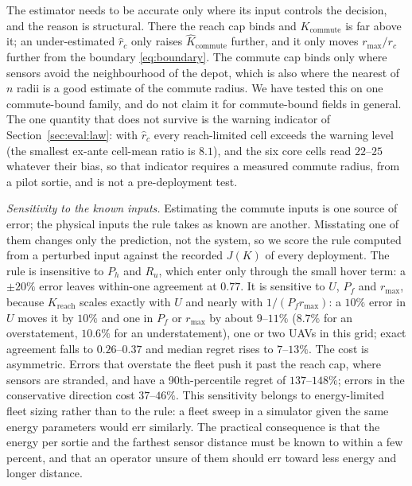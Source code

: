 \documentclass[journal,outdir=./]{IEEEtran}
\newcommand{\Kr}{K_{\mathrm{reach}}}
\newcommand{\Kc}{K_{\mathrm{commute}}}
\newcommand{\rmax}{r_{\max}}
\newcommand{\rc}{r_{c}}
\newcommand{\Pf}{P_{f}}
\newcommand{\Ph}{P_{h}}
\newcommand{\Ru}{R_u}
\begin{document}
The estimator needs to be accurate only where its input controls the decision, and the reason is structural. There the reach cap binds and $\Kc$ is far above it; an under-estimated $\hat\rc$ only raises $\hat\Kc$ further, and it only moves $\rmax/\rc$ further from the boundary \eqref{eq:boundary}. The commute cap binds only where sensors avoid the neighbourhood of the depot, which is also where the nearest of $n$ radii is a good estimate of the commute radius. We have tested this on one commute-bound family, and do not claim it for commute-bound fields in general. The one quantity that does not survive is the warning indicator of Section~\ref{sec:eval:law}: with $\hat\rc$ every reach-limited cell exceeds the warning level (the smallest ex-ante cell-mean ratio is $8.1$), and the six core cells read $22$--$25$ whatever their bias, so that indicator requires a measured commute radius, from a pilot sortie, and is not a pre-deployment test.

\textit{Sensitivity to the known inputs.} Estimating the commute inputs is one source of error; the physical inputs the rule takes as known are another. Misstating one of them changes only the prediction, not the system, so we score the rule computed from a perturbed input against the recorded $J(K)$ of every deployment. The rule is insensitive to $\Ph$ and $\Ru$, which enter only through the small hover term: a $\pm20\%$ error leaves within-one agreement at $0.77$. It is sensitive to $U$, $\Pf$ and $\rmax$, because $\Kr$ scales exactly with $U$ and nearly with $1/(\Pf\rmax)$: a $10\%$ error in $U$ moves it by $10\%$ and one in $\Pf$ or $\rmax$ by about $9$--$11\%$ ($8.7\%$ for an overstatement, $10.6\%$ for an understatement), one or two UAVs in this grid; exact agreement falls to $0.26$--$0.37$ and median regret rises to $7$--$13\%$. The cost is asymmetric. Errors that overstate the fleet push it past the reach cap, where sensors are stranded, and have a 90th-percentile regret of $137$--$148\%$; errors in the conservative direction cost $37$--$46\%$. This sensitivity belongs to energy-limited fleet sizing rather than to the rule: a fleet sweep in a simulator given the same energy parameters would err similarly. The practical consequence is that the energy per sortie and the farthest sensor distance must be known to within a few percent, and that an operator unsure of them should err toward less energy and longer distance.
\end{document}
